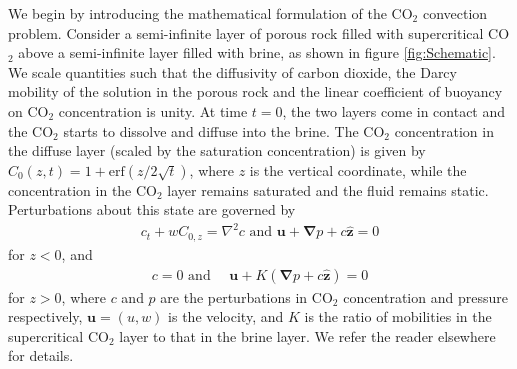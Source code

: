 \documentclass[letterpaper,10pt,prl,twocolumn,aps,reprint,superscriptaddress]{revtex4-1}
\newcommand{\cotwo}{CO$_2$ }
\newcommand{\erf}{\text{erf}}
\newcommand{\bu}{\boldsymbol{u}}
\newcommand{\bz}{\hat{\boldsymbol{z}}}
\newcommand{\grad}{\boldsymbol{\nabla}}
\begin{document}
We begin by introducing the mathematical formulation of the \cotwo convection problem.
Consider a semi-infinite layer of porous rock filled with supercritical \cotwo above a semi-infinite layer filled with brine, as shown in figure \ref{fig:Schematic}. 
We scale quantities such that the diffusivity of carbon dioxide, the Darcy mobility of the solution in the porous rock and the linear coefficient of buoyancy on \cotwo concentration is unity. 
At time $t=0$, the two layers come in contact and the \cotwo starts to dissolve and diffuse into the brine. 
The \cotwo concentration in the diffuse layer (scaled by the saturation concentration) is given by $C_0(z,t) = 1 + \erf( {z}/{2\sqrt{t}})$, where $z$ is the vertical coordinate, while the concentration in the \cotwo layer remains saturated and the fluid remains static. 
Perturbations about this state are governed by 
\begin{align}
 c_t + w C_{0,z} = \nabla^2 c \text{ and }
 \bu + \grad p + c\bz = 0
 \label{eqn:linone}
\end{align}
for $z<0$, and 
\begin{align}
 c = 0 \text{ and } \quad \bu + K (\grad p + c\bz) = 0
 \label{eqn:lintwo}
\end{align}
for $z>0$, where $c$ and $p$ are the perturbations in \cotwo concentration and pressure respectively, $\bu = (u,w)$ is the velocity, and $K$ is the ratio of mobilities in the supercritical \cotwo layer to that in the brine layer. 
We refer the reader elsewhere\cite{SlimRama10} for details. 
\end{document}
